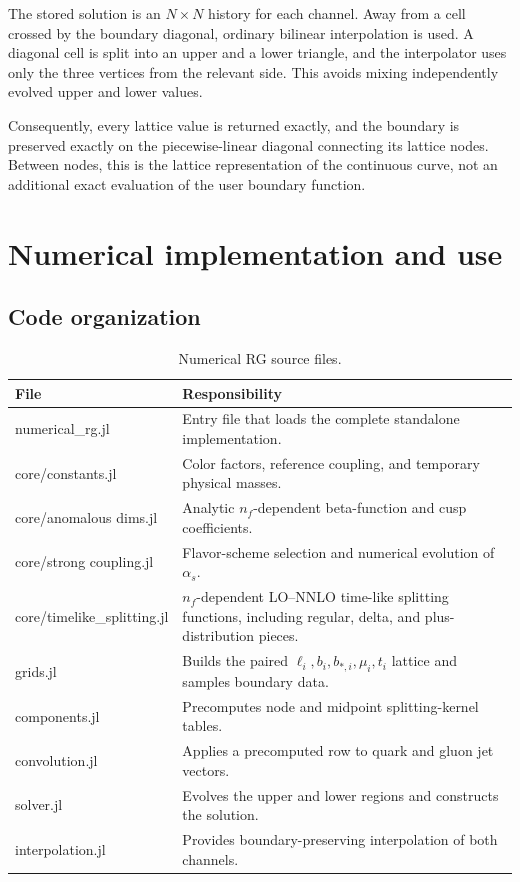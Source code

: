 \documentclass[11pt]{article}
\begin{document}
The stored solution is an \(N\times N\) history for each channel. Away from a
cell crossed by the boundary diagonal, ordinary bilinear interpolation is
used. A diagonal cell is split into an upper and a lower triangle, and the
interpolator uses only the three vertices from the relevant side. This avoids
mixing independently evolved upper and lower values.

Consequently, every lattice value is returned exactly, and the boundary is
preserved exactly on the piecewise-linear diagonal connecting its lattice
nodes. Between nodes, this is the lattice representation of the continuous
curve, not an additional exact evaluation of the user boundary function.

\clearpage
\section{Numerical implementation and use}
\label{sec:numerical-implementation}

\subsection{Code organization}

\begin{table}[H]
\centering
\caption{Numerical RG source files.}
\label{tab:source-files}
\begin{tabularx}{\textwidth}{@{}>{\ttfamily}l X@{}}
\toprule
\textrm{File} & \textrm{Responsibility}\\
\midrule
numerical\_rg.jl
  & Entry file that loads the complete standalone implementation.\\
core/constants.jl
  & Color factors, reference coupling, and temporary physical masses.\\
core/anomalous dims.jl
  & Analytic \(n_f\)-dependent beta-function and cusp coefficients.\\
core/strong coupling.jl
  & Flavor-scheme selection and numerical evolution of \(\alpha_s\).\\
core/timelike\_splitting.jl
  & \(n_f\)-dependent LO--NNLO time-like splitting functions, including
    regular, delta, and plus-distribution pieces.\\
grids.jl
  & Builds the paired \(\ell_i,b_i,b_{*,i},\mu_i,t_i\) lattice and samples
    boundary data.\\
components.jl
  & Precomputes node and midpoint splitting-kernel tables.\\
convolution.jl
  & Applies a precomputed row to quark and gluon jet vectors.\\
solver.jl
  & Evolves the upper and lower regions and constructs the solution.\\
interpolation.jl
  & Provides boundary-preserving interpolation of both channels.\\
\bottomrule
\end{tabularx}
\end{table}
\end{document}
